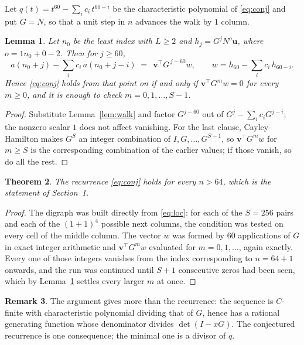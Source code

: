 \documentclass[11pt,a4paper]{article}
\theoremstyle{plain}
\newtheorem{theorem}{Theorem}
\newtheorem{lemma}[theorem]{Lemma}
\theoremstyle{definition}
\newtheorem{remark}[theorem]{Remark}
\begin{document}
Let $q(t)=t^{60}-\sum_i c_i\,t^{60-i}$ be the characteristic polynomial of
\eqref{eq:conj} and put $G=N$, so that a unit step in $n$ advances the walk by
$1$ column.

\begin{lemma}\label{lem:crit}
Let $n_0$ be the least index with $L\ge2$ and $h_j=G^{j}N^{o}\mathbf{u}$, where
$o=1n_0+0-2$. Then for $j\ge60$,
\[
a(n_0+j)-\sum_i c_i\,a(n_0+j-i)\;=\;\,\mathbf{v}^{\!\top}G^{\,j-60}w,
\qquad w=h_{60}-\sum_i c_i\,h_{60-i} .
\]
Hence \eqref{eq:conj} holds from that point on if and only if
$\mathbf{v}^{\!\top}G^{m}w=0$ for every $m\ge0$, and it is enough to check
$m=0,1,\dots,S-1$.
\end{lemma}

\begin{proof}
Substitute Lemma~\ref{lem:walk} and factor $G^{j-60}$ out of
$G^{j}-\sum_ic_iG^{j-i}$; the nonzero scalar $1$ does not affect
vanishing. For the last clause, Cayley--Hamilton makes $G^{S}$ an integer combination of
$I,G,\dots,G^{S-1}$, so $\mathbf{v}^{\!\top}G^{m}w$ for $m\ge S$ is the corresponding
combination of the earlier values; if those vanish, so do all the rest.
\end{proof}

\begin{theorem}
The recurrence \eqref{eq:conj} holds for every $n>64$, which is the statement of
Section~1.
\end{theorem}

\begin{proof}
The digraph was built directly from \eqref{eq:loc}: for each of the $S=256$ pairs and each
of the $(1+1)^{4}$ possible next columns, the condition was tested on every cell of
the middle column. The vector $w$ was formed by $60$ applications of $G$ in exact integer
arithmetic and $\mathbf{v}^{\!\top}G^{m}w$ evaluated for $m=0,1,\dots$, again exactly.
Every one of those integers vanishes from the index corresponding to $n=64+1$ onwards,
and the run was continued until $S+1$ consecutive zeros had been seen, which by
Lemma~\ref{lem:crit} settles every larger $m$ at once.
\end{proof}

\begin{remark}
The argument gives more than the recurrence: the sequence is $C$-finite with characteristic
polynomial dividing that of $G$, hence has a rational generating function whose denominator
divides $\det(I-xG)$. The conjectured recurrence is one consequence; the minimal one is a
divisor of $q$.
\end{remark}
\end{document}
